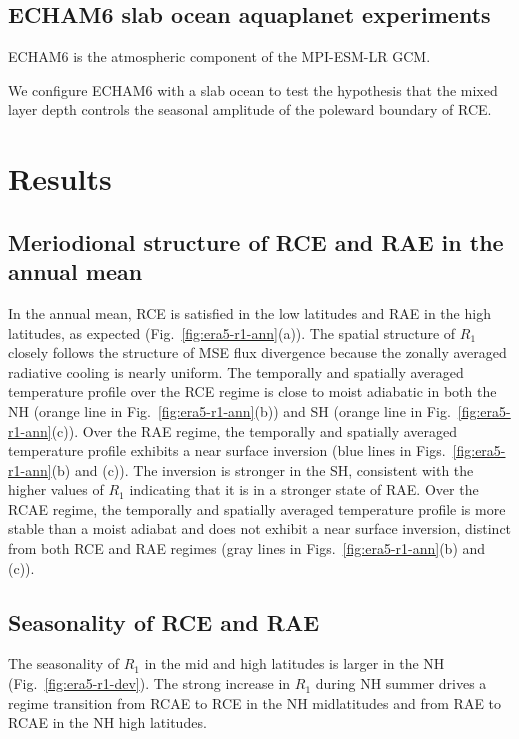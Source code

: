 \documentclass{ametsocV5}
\begin{document}
\subsection{ECHAM6 slab ocean aquaplanet experiments}
  ECHAM6 is the atmospheric component of the MPI-ESM-LR GCM.
  
  We configure ECHAM6 with a slab ocean to test the hypothesis that the mixed layer depth controls the seasonal amplitude of the poleward boundary of RCE.

\section{Results} \label{sec:results}

\subsection{Meriodional structure of RCE and RAE in the annual mean}
    In the annual mean, RCE is satisfied in the low latitudes and RAE in the high latitudes, as expected (Fig.~\ref{fig:era5-r1-ann}(a)). The spatial structure of $R_1$ closely follows the structure of MSE flux divergence because the zonally averaged radiative cooling is nearly uniform. The temporally and spatially averaged temperature profile over the RCE regime is close to moist adiabatic in both the NH (orange line in Fig.~\ref{fig:era5-r1-ann}(b)) and SH (orange line in Fig.~\ref{fig:era5-r1-ann}(c)). Over the RAE regime, the temporally and spatially averaged temperature profile exhibits a near surface inversion (blue lines in Figs.~\ref{fig:era5-r1-ann}(b) and (c)). The inversion is stronger in the SH, consistent with the higher values of $R_{1}$ indicating that it is in a stronger state of RAE. Over the RCAE regime, the temporally and spatially averaged temperature profile is more stable than a moist adiabat and does not exhibit a near surface inversion, distinct from both RCE and RAE regimes (gray lines in Figs.~\ref{fig:era5-r1-ann}(b) and (c)).
    
\subsection{Seasonality of RCE and RAE}
    The seasonality of \(R_{1}\) in the mid and high latitudes is larger in the NH (Fig.~\ref{fig:era5-r1-dev}). The strong increase in \(R_{1}\) during NH summer drives a regime transition from RCAE to RCE in the NH midlatitudes and from RAE to RCAE in the NH high latitudes.
  
\end{document}
